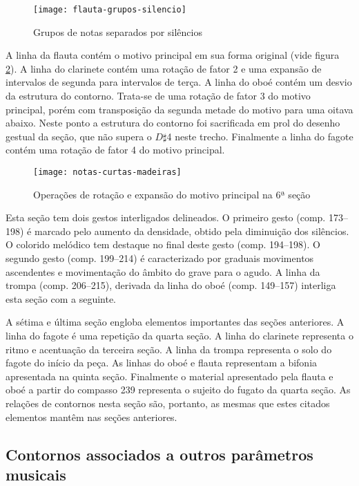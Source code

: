 \begin{figure}
  \centering
  \texttt{[image: flauta-grupos-silencio]}
  \caption{Grupos de notas separados por silêncios}
  \label{fig:grupos-separados-silencio}
\end{figure}

A linha da flauta contém o motivo principal em sua forma original
(vide figura \ref{fig:notas-curtas-madeiras}). A linha do clarinete
contém uma rotação de fator 2 e uma expansão de intervalos de segunda
para intervalos de terça. A linha do oboé contém um desvio da
estrutura do contorno. Trata-se de uma rotação de fator 3 do motivo
principal, porém com transposição da segunda metade do motivo para uma
oitava abaixo. Neste ponto a estrutura do contorno foi sacrificada em
prol do desenho gestual da seção, que não supera o $D\sharp$4 neste
trecho. Finalmente a linha do fagote contém uma rotação de fator 4 do
motivo principal.

\begin{figure}
  \centering
    \texttt{[image: notas-curtas-madeiras]}
    \caption{Operações de rotação e expansão do motivo principal na 6ª
    seção}
  \label{fig:notas-curtas-madeiras}
\end{figure}

Esta seção tem dois gestos interligados delineados. O primeiro gesto
(comp. 173--198) é marcado pelo aumento da densidade, obtido pela
diminuição dos silêncios. O colorido melódico tem destaque no final
deste gesto (comp. 194--198). O segundo gesto (comp. 199--214) é
caracterizado por graduais movimentos ascendentes e movimentação do
âmbito do grave para o agudo. A linha da trompa (comp. 206--215),
derivada da linha do oboé (comp. 149--157) interliga esta seção com a
seguinte.

A sétima e última seção engloba elementos importantes das seções
anteriores. A linha do fagote é uma repetição da quarta seção. A linha
do clarinete representa o ritmo e acentuação da terceira seção. A
linha da trompa representa o solo do fagote do início da peça. As
linhas do oboé e flauta representam a bifonia apresentada na quinta
seção. Finalmente o material apresentado pela flauta e oboé a partir
do compasso 239 representa o sujeito do fugato da quarta seção. As
relações de contornos nesta seção são, portanto, as mesmas que estes
citados elementos mantêm nas seções anteriores.

\subsection{Contornos associados a outros parâmetros musicais}
\label{sec:cont-assoc-outr}

